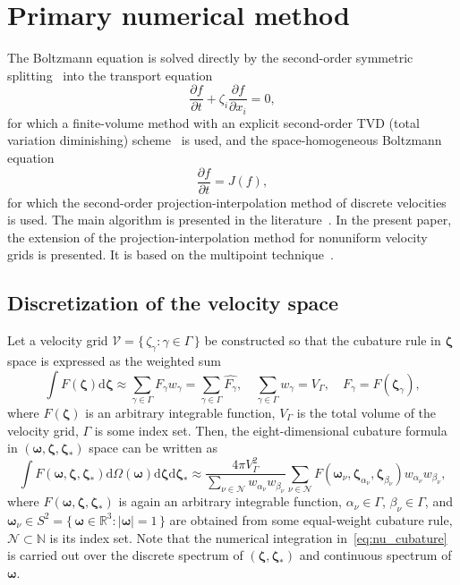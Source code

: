 \documentclass[review]{elsarticle}
\newcommand{\dd}{\mathrm{d}}
\newcommand{\pder}[2][]{\frac{\partial#1}{\partial#2}}
\newcommand{\dzeta}{\boldsymbol{\dd\zeta}}
\newcommand{\bzeta}{\boldsymbol{\zeta}}
\newcommand{\Nu}{\mathcal{N}}
\newcommand{\Set}[2]{\{\,{#1}:{#2}\,\}}
\begin{document}
\section{Primary numerical method}

The Boltzmann equation is solved directly by the second-order symmetric splitting~\citep{Strang1968,Bobylev2001}
into the transport equation
\begin{equation}\label{eq:split_transport}
    \pder[f]{t} + \zeta_i\pder[f]{x_i} = 0,
\end{equation}
for which a finite-volume method with
an explicit second-order TVD (total variation diminishing) scheme~\citep{Harten1983} is used,
and the space-homogeneous Boltzmann equation
\begin{equation}\label{eq:split_collisions}
    \pder[f]{t} = J(f),
\end{equation}
for which the second-order projection-interpolation method of discrete velocities is used.
The main algorithm is presented in the literature~\citep[see e.g.][]{Tcheremissine1998, Tcheremissine2006, Dodulad2015}.
In the present paper, the extension of the projection-interpolation method
for nonuniform velocity grids is presented.
It is based on the multipoint technique~\citep{Dodulad2012}.

\subsection{Discretization of the velocity space}

Let a velocity grid \(\mathcal{V} = \Set{\zeta_\gamma}{\gamma\in\Gamma}\) be constructed so that
the cubature rule in \(\bzeta\) space is expressed as the weighted sum
\begin{equation}\label{eq:bzeta_cubature}
    \int F(\bzeta) \dzeta \approx \sum_{\gamma\in\Gamma} F_\gamma w_\gamma =
        \sum_{\gamma\in\Gamma} \hat{F_\gamma}, \quad
    \sum_{\gamma\in\Gamma} w_\gamma = V_\Gamma, \quad
    F_\gamma = F(\bzeta_\gamma),
\end{equation}
where \(F(\bzeta)\) is an arbitrary integrable function,
\(V_\Gamma\) is the total volume of the velocity grid, \(\Gamma\) is some index set.
Then, the eight-dimensional cubature formula in \((\boldsymbol{\omega},\bzeta,\bzeta_*)\) space can be written as
\begin{equation}\label{eq:nu_cubature}
    \int F(\boldsymbol{\omega},\bzeta,\bzeta_*) \dd\Omega(\boldsymbol{\omega})\dzeta\dzeta_* \approx
        \frac{4\pi V_\Gamma^2}{ \sum_{\nu\in\Nu} w_{\alpha_\nu}w_{\beta_\nu} }
        \sum_{\nu\in\Nu} F(\boldsymbol{\omega}_\nu,\bzeta_{\alpha_\nu},\bzeta_{\beta_\nu}) w_{\alpha_\nu}w_{\beta_\nu},
\end{equation}
where \(F(\boldsymbol{\omega},\bzeta,\bzeta_*)\) is again an arbitrary integrable function,
\(\alpha_\nu\in\Gamma\), \(\beta_\nu\in\Gamma\),
and \(\boldsymbol{\omega}_\nu\in S^2 = \Set{\boldsymbol{\omega}\in\mathbb{R}^3}{|\boldsymbol{\omega}| = 1}\)
are obtained from some equal-weight cubature rule,
\(\Nu\subset\mathbb{N}\) is its index set.
Note that the numerical integration in~\eqref{eq:nu_cubature} is carried out over
the discrete spectrum of \((\bzeta,\bzeta_*)\) and continuous spectrum of \(\boldsymbol{\omega}\).
\end{document}
